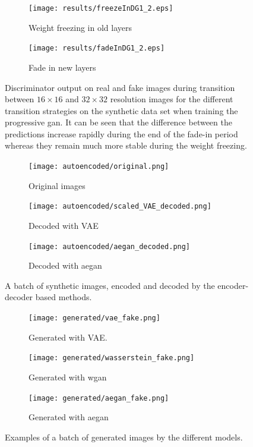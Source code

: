 \begin{figure}[t]
    \centering
    \begin{subfigure}[b]{0.49\textwidth}
        \texttt{[image: results/freezeInDG1\_2.eps]}
        \caption{Weight freezing in old layers}
        \label{fig:freezeInDG1}
    \end{subfigure}
    \begin{subfigure}[b]{0.49\textwidth}
        \texttt{[image: results/fadeInDG1\_2.eps]}
        \caption{Fade in new layers}
        \label{fig:freezeInDG2}
    \end{subfigure}
    \caption{Discriminator output on real and fake images during transition between $16\times16$ and $32\times32$ resolution images for the different transition strategies on the synthetic data set when training the progressive \acrshort{gan}. It can be seen that the difference between the predictions increase rapidly during the end of the fade-in period whereas they remain much more stable during the weight freezing.}
    \label{fig:fadeVsFreeze}
\end{figure}

\begin{figure}[t]
    \centering
    \begin{subfigure}[b]{\textwidth}
        \texttt{[image: autoencoded/original.png]}
        \caption{Original images}
        \label{fig:stuff}
    \end{subfigure}
    \begin{subfigure}[b]{\textwidth}
        \texttt{[image: autoencoded/scaled\_VAE\_decoded.png]}
        \caption{Decoded with VAE}
        \label{fig:stuff}
    \end{subfigure}
    \begin{subfigure}[b]{\textwidth}
        \texttt{[image: autoencoded/aegan\_decoded.png]}
        \caption{Decoded with \acrshort{aegan}}
        \label{fig:stuff}
    \end{subfigure}
    \caption{A batch of synthetic images, encoded and decoded by the encoder-decoder based methods.}
    \label{fig:autoencoders}
\end{figure}

\begin{figure}[t]
    \centering
    \begin{subfigure}[b]{\textwidth}
        \texttt{[image: generated/vae\_fake.png]}
        \caption{Generated with VAE.}
        \label{fig:stuff}
    \end{subfigure}
    \begin{subfigure}[b]{\textwidth}
        \texttt{[image: generated/wasserstein\_fake.png]}
        \caption{Generated with \acrshort{wgan}}
        \label{fig:stuff}
    \end{subfigure}
    \begin{subfigure}[b]{\textwidth}
        \texttt{[image: generated/aegan\_fake.png]}
        \caption{Generated with \acrshort{aegan}}
        \label{fig:stuff}
    \end{subfigure}
    \caption{Examples of a batch of generated images by the different models.}
    \label{fig:gans}
\end{figure}


